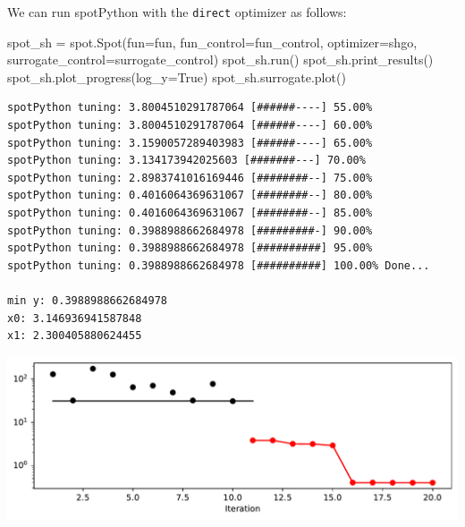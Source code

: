 \documentclass[
  letterpaper,
  DIV=11,
  numbers=noendperiod]{scrreprt}
\newenvironment{Shaded}{\begin{snugshade}}{\end{snugshade}}
\newcommand{\NormalTok}[1]{\textcolor[rgb]{0.00,0.23,0.31}{#1}}
\newcommand{\OperatorTok}[1]{\textcolor[rgb]{0.37,0.37,0.37}{#1}}
\newcommand{\VariableTok}[1]{\textcolor[rgb]{0.07,0.07,0.07}{#1}}
\begin{document}
\begin{tcolorbox}[enhanced jigsaw, coltitle=black, bottomrule=.15mm, breakable, toprule=.15mm, colframe=quarto-callout-tip-color-frame, title=\textcolor{quarto-callout-tip-color}{\faLightbulb}\hspace{0.5em}{Tip: Selecting the Optimizer for the Surrogate}, colbacktitle=quarto-callout-tip-color!10!white, opacityback=0, left=2mm, leftrule=.75mm, colback=white, rightrule=.15mm, bottomtitle=1mm, toptitle=1mm, titlerule=0mm, arc=.35mm, opacitybacktitle=0.6]

We can run spotPython with the \texttt{direct} optimizer as follows:

\begin{Shaded}
\begin{Highlighting}[]
\NormalTok{spot\_sh }\OperatorTok{=}\NormalTok{ spot.Spot(fun}\OperatorTok{=}\NormalTok{fun,}
\NormalTok{                    fun\_control}\OperatorTok{=}\NormalTok{fun\_control,}
\NormalTok{                    optimizer}\OperatorTok{=}\NormalTok{shgo,}
\NormalTok{                    surrogate\_control}\OperatorTok{=}\NormalTok{surrogate\_control)}
\NormalTok{spot\_sh.run()}
\NormalTok{spot\_sh.print\_results()}
\NormalTok{spot\_sh.plot\_progress(log\_y}\OperatorTok{=}\VariableTok{True}\NormalTok{)}
\NormalTok{spot\_sh.surrogate.plot()}
\end{Highlighting}
\end{Shaded}

\begin{verbatim}
spotPython tuning: 3.8004510291787064 [######----] 55.00% 
spotPython tuning: 3.8004510291787064 [######----] 60.00% 
spotPython tuning: 3.1590057289403983 [######----] 65.00% 
spotPython tuning: 3.134173942025603 [#######---] 70.00% 
spotPython tuning: 2.8983741016169446 [########--] 75.00% 
spotPython tuning: 0.4016064369631067 [########--] 80.00% 
spotPython tuning: 0.4016064369631067 [########--] 85.00% 
spotPython tuning: 0.3988988662684978 [#########-] 90.00% 
spotPython tuning: 0.3988988662684978 [##########] 95.00% 
spotPython tuning: 0.3988988662684978 [##########] 100.00% Done...

min y: 0.3988988662684978
x0: 3.146936941587848
x1: 2.300405880624455
\end{verbatim}

\includegraphics{004_spot_sklearn_optimization_files/figure-pdf/cell-11-output-2.pdf}


\end{tcolorbox}
\end{document}
